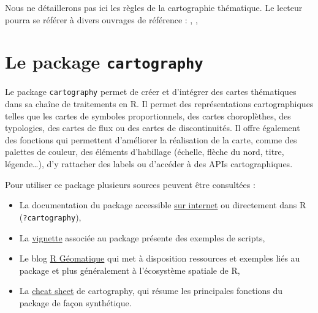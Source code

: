 \documentclass[]{book}
\providecommand{\tightlist}{%
  \setlength{\itemsep}{0pt}\setlength{\parskip}{0pt}}
\begin{document}
Nous ne détaillerons pas ici les règles de la cartographie thématique.
Le lecteur pourra se référer à divers ouvrages de référence :
\citet{Bertin67}, \citet{Beguin10}, \citet{Lambert16}

\section{\texorpdfstring{Le package
\texttt{cartography}}{Le package cartography}}\label{le-package-cartography}

Le package \texttt{cartography} \citep{R-cartography} permet de créer et
d'intégrer des cartes thématiques dans sa chaîne de traitements en R. Il
permet des représentations cartographiques telles que les cartes de
symboles proportionnels, des cartes choroplèthes, des typologies, des
cartes de flux ou des cartes de discontinuités. Il offre également des
fonctions qui permettent d'améliorer la réalisation de la carte, comme
des palettes de couleur, des éléments d'habillage (échelle, flèche du
nord, titre, légende\ldots{}), d'y rattacher des labels ou d'accéder à
des APIs cartographiques.

Pour utiliser ce package plusieurs sources peuvent être consultées :

\begin{itemize}
\tightlist
\item
  La documentation du package accessible
  \href{http://riatelab.github.io/cartography/docs/}{sur internet} ou
  directement dans R (\texttt{?cartography}),
\item
  La
  \href{https://CRAN.R-project.org/package=cartography/vignettes/cartography.html}{vignette}
  associée au package présente des exemples de scripts,
\item
  Le blog \href{https://rgeomatic.hypotheses.org/}{R Géomatique} qui met
  à disposition ressources et exemples liés au package et plus
  généralement à l'écosystème spatiale de R,
\item
  La
  \href{http://riatelab.github.io/cartography/vignettes/cheatsheet/cartography_cheatsheet.pdf}{cheat
  sheet} de cartography, qui résume les principales fonctions du package
  de façon synthétique.
\end{itemize}
\end{document}
